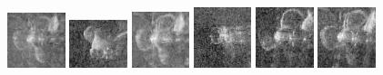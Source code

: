 \begin{figure}
    \includegraphics[width=0.15\textwidth]{chapters/images/dataset/all-class-images/propeler/propeler-96.jpg}
    \includegraphics[width=0.15\textwidth]{chapters/images/dataset/all-class-images/propeler/propeler-123.jpg}
    \includegraphics[width=0.15\textwidth]{chapters/images/dataset/all-class-images/propeler/propeler-34.jpg}
    \includegraphics[width=0.15\textwidth]{chapters/images/dataset/all-class-images/propeler/propeler-13.jpg}
    \includegraphics[width=0.15\textwidth]{chapters/images/dataset/all-class-images/propeler/propeler-68.jpg}
    \includegraphics[width=0.15\textwidth]{chapters/images/dataset/all-class-images/propeler/propeler-48.jpg}
    

\end{figure}
